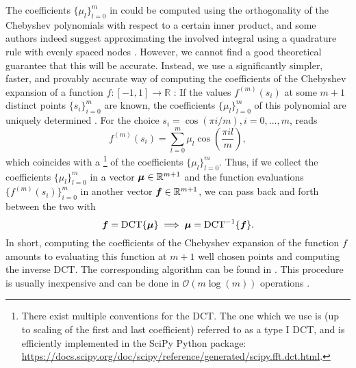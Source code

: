 The coefficients $\{\mu_l\}_{l=0}^{m}$ in 
could be computed using the orthogonality of the Chebyshev polynomials with respect
to a certain inner product, and some authors indeed suggest approximating the
involved integral using a quadrature rule with evenly spaced nodes
\cite[equation~8]{lin2017randomized}.
However, we cannot find a good theoretical guarantee that this will be accurate.
Instead, we use a significantly simpler, faster, and provably accurate way of
computing the coefficients of the Chebyshev expansion of a function
$f:[-1,1] \to \mathbb{R}$ \cite{trefethen2019chebyshev, ahmed1970chebyshev}:
If the values $f^{(m)}(s_i)$ at some $m+1$ distinct points $\{s_i\}_{i=0}^m$ are
known, the coefficients $\{\mu_l\}_{l=0}^{m}$ of this polynomial are
uniquely determined \cite{gauss1799demonstratio}. For the choice $s_i = \cos(\pi i/m), i=0,\dots,m$,
 reads
\begin{equation}
    f^{(m)}(s_i) = \sum_{l=0}^{m} \mu_l \cos\left(\frac{\pi i l}{m}\right),
    \label{equ:2-chebyshev-chebyshev-nodes-evaluation}
\end{equation}
which coincides with a \footnote{There exist multiple conventions for the \gls{DCT}.
The one which we use is (up to scaling of the first and last coefficient)
referred to as a type I \gls{DCT}, and is efficiently implemented in the SciPy Python package:
\url{https://docs.scipy.org/doc/scipy/reference/generated/scipy.fft.dct.html}.} of the coefficients $\{\mu_l\}_{l=0}^{m}$.
Thus, if we collect the coefficients $\{\mu_l\}_{l=0}^{m}$ in a vector $\boldsymbol{\mu} \in \mathbb{R}^{m+1}$ 
and the function evaluations $\{f^{(m)}(s_i)\}_{i=0}^{m}$ in another
vector $\boldsymbol{f} \in \mathbb{R}^{m+1}$, we can pass back and forth between the
two with
\begin{equation}
    \boldsymbol{f} = \operatorname{DCT} \{ \boldsymbol{\mu} \} \implies \boldsymbol{\mu} = \operatorname{DCT}^{-1}\{ \boldsymbol{f} \}.
    \label{equ:2-chebyshev-chebyshev-DCT}
\end{equation}
In short, computing the coefficients of the Chebyshev expansion 
of the function $f$ amounts to evaluating this function at $m+1$ well
chosen points and computing the inverse \gls{DCT}. The corresponding algorithm
can be found in .
This procedure is usually inexpensive and can be done in $\mathcal{O}(m \log(m))$
operations \cite{makhoul1980fct}.

